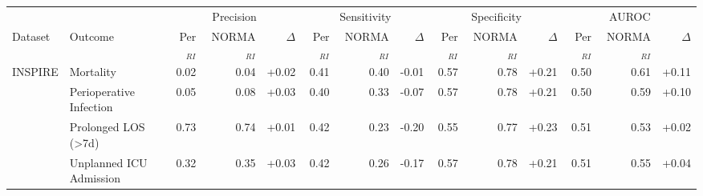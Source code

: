 \begin{table}[ht]
\centering
\footnotesize
\begin{tabular}{llrrrrrrrrrrrr}
\toprule
 &  & \multicolumn{3}{c}{Precision} & \multicolumn{3}{c}{Sensitivity} & \multicolumn{3}{c}{Specificity} & \multicolumn{3}{c}{AUROC} \\
\cmidrule(lr){3-5} \cmidrule(lr){6-8} \cmidrule(lr){9-11} \cmidrule(lr){12-14}
Dataset & Outcome & Per$_{RI}$ & NORMA$_{RI}$ & $\Delta$ & Per$_{RI}$ & NORMA$_{RI}$ & $\Delta$ & Per$_{RI}$ & NORMA$_{RI}$ & $\Delta$ & Per$_{RI}$ & NORMA$_{RI}$ & $\Delta$ \\
\midrule
INSPIRE & Mortality & 0.02 & 0.04 & +0.02 & 0.41 & 0.40 & -0.01 & 0.57 & 0.78 & +0.21 & 0.50 & 0.61 & +0.11 \\
 & Perioperative Infection & 0.05 & 0.08 & +0.03 & 0.40 & 0.33 & -0.07 & 0.57 & 0.78 & +0.21 & 0.50 & 0.59 & +0.10 \\
 & Prolonged LOS (>7d) & 0.73 & 0.74 & +0.01 & 0.42 & 0.23 & -0.20 & 0.55 & 0.77 & +0.23 & 0.51 & 0.53 & +0.02 \\
 & Unplanned ICU Admission & 0.32 & 0.35 & +0.03 & 0.42 & 0.26 & -0.17 & 0.57 & 0.78 & +0.21 & 0.51 & 0.55 & +0.04 \\
\bottomrule
\end{tabular}
\label{tab:12_eval}
\end{table}